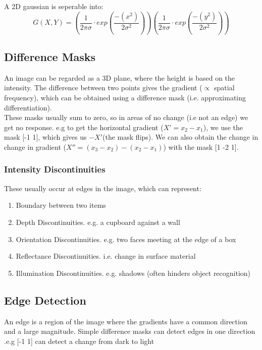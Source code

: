 A 2D gaussian is seperable into:
\begin{equation}
    G(X,Y) = \left(\frac{1}{2\pi\sigma} \cdot exp \left( \frac{-(x^2)}{2\sigma^2} \right)\right) \left(\frac{1}{2\pi\sigma} \cdot exp \left( \frac{-(y^2)}{2\sigma^2} \right)\right)
\end{equation}

\subsection{Difference Masks}
An image can be regarded as a 3D plane, where the height is based on the intensity. The difference between two points gives the gradient ($\propto$ spatial frequency), which can be obtained using a difference mask (i.e. approximating differentiation).\\

These masks usually sum to zero, so in areas of no change (i.e not an edge) we get no response. e.g to get the horizontal gradient ($X'=x_2-x_1$), we use the mask [-1 1], which gives us $-X'$(the mask flips). We can also obtain the change in change in gradient ($X'' = (x_3-x_2)-(x_2-x_1)$) with the mask [1 -2 1]. 

\subsubsection{Intensity Discontinuities}
These usually occur at edges in the image, which can represent:
\begin{enumerate}
    \item Boundary between two items
    \item Depth Discontinuities. e.g. a cupboard against a wall
    \item Orientation Discontinuities. e.g. two faces meeting at the edge of a box
    \item Reflectance Discontinuities. i.e. change in surface material
    \item Illumination Discontinuities. e.g. shadows (often hinders object recognition)
\end{enumerate}

\subsection{Edge Detection}
An edge is a region of the image where the gradients have a common direction and a large magnitude. Simple difference masks can detect edges in one direction .e.g [-1 1] can detect a change from dark to light

